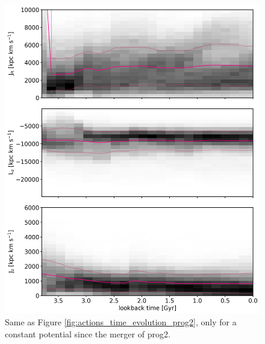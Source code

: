 \begin{figure}[htbp]
\captionsetup{format=plain}
    \centering
	\includegraphics[width=\textwidth]{plots/Dynamics/mean_pot/action_time_evolution_hist_mean_prog2.png}

	\caption{Same as Figure \ref{fig:actions_time_evolution_prog2}, only for a constant potential since the merger of prog2.}\label{fig:actions_time_evolution_mean_pot_prog2}
\end{figure}
\iffalse
